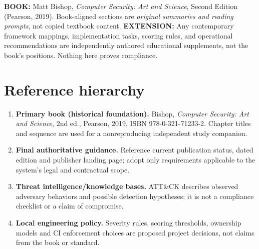 \documentclass[10pt,letterpaper]{article}
\begin{document}
\makedoctocpage
\begin{notebox}
\textbf{BOOK:} Matt Bishop, \emph{Computer Security: Art and Science}, Second Edition (Pearson, 2019). Book-aligned sections are \emph{original summaries and reading prompts}, not copied textbook content.
\textbf{EXTENSION:} Any contemporary framework mappings, implementation tasks, scoring rules, and operational recommendations are independently authored educational supplements, not the book's positions. Nothing here proves compliance.
\end{notebox}
\section{Reference hierarchy}
\begin{enumerate}
\item \textbf{Primary book (historical foundation).} Bishop, \emph{Computer Security: Art and Science}, 2nd ed., Pearson, 2019, ISBN 978-0-321-71233-2. Chapter titles and sequence are used for a nonreproducing independent study companion.
\item \textbf{Final authoritative guidance.} Reference current publication status, dated edition and publisher landing page; adopt only requirements applicable to the system's legal and contractual scope.
\item \textbf{Threat intelligence/knowledge bases.} ATT\&CK describes observed adversary behaviors and possible detection hypotheses; it is not a compliance checklist or a claim of compromise.
\item \textbf{Local engineering policy.} Severity rules, scoring thresholds, ownership models and CI enforcement choices are proposed project decisions, not claims from the book or standard.
\end{enumerate}
\end{document}
